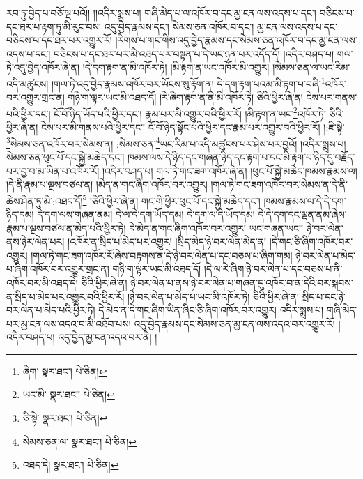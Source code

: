 རབ་ཏུ་བྱེད་པ་བཅོ་ལྔ་པའོ།། །།འདིར་སྨྲས་པ། གཞི་མེད་པ་ལ་འཁོར་བ་དང་མྱ་ངན་ལས་འདས་པ་དང་། བཅིངས་པ་དང་ཐར་པ་རྟག་ཏུ་མི་རུང་བས། འདུ་བྱེད་རྣམས་དང་། སེམས་ཅན་འཁོར་བ་དང་། མྱ་ངན་ལས་འདས་པ་དང་བཅིངས་པ་དང་ཐར་པར་འགྱུར་རོ། །རིགས་པ་གང་གིས་འདུ་བྱེད་རྣམས་དང་སེམས་ཅན་འཁོར་བ་དང་མྱ་ངན་ལས་འདས་པ་དང་། བཅིངས་པ་དང་ཐར་པར་མི་འཐད་པར་བསྟན་པ་དེ་ཡང་ཉན་པར་འདོད་དོ། །འདིར་བཤད་པ། གལ་ཏེ་འདུ་བྱེད་འཁོར་ཞེ་ན། །དེ་དག་རྟག་ན་མི་འཁོར་ཏེ། །མི་རྟག་ན་ཡང་འཁོར་མི་འགྱུར། །སེམས་ཅན་ལ་ཡང་རིམ་འདི་མཚུངས། །གལ་ཏེ་འདུ་བྱེད་རྣམས་འཁོར་བར་ཡོངས་སུ་རྟོག་ན། དེ་དག་རྟག་པའམ་མི་རྟག་པ་བཞི་\footnote{ཞིག་  སྣར་ཐང་།  པེ་ཅིན། }འཁོར་བར་འགྱུར་གྲང་ན། གཉི་ག་ལྟར་ཡང་མི་འཐད་དོ། །རེ་ཞིག་རྟག་ན་ནི་མི་འཁོར་ཏེ། ཅིའི་ཕྱིར་ཞེ་ན། ངེས་པར་གནས་པའི་ཕྱིར་དང་། ངོ་བོ་ཉིད་ཡོད་པའི་ཕྱིར་དང་། རྣམ་པར་མི་འགྱུར་བའི་ཕྱིར་རོ། །མི་རྟག་ན་ཡང་\footnote{ཡང་མི་  སྣར་ཐང་།  པེ་ཅིན། }འཁོར་ཏེ། ཅིའི་ཕྱིར་ཞེ་ན། ངེས་པར་མི་གནས་པའི་ཕྱིར་དང་། ངོ་བོ་ཉིད་སྟོང་པའི་ཕྱིར་དང་རྣམ་པར་འགྱུར་བའི་ཕྱིར་རོ། །:ཇི་སྟེ་\footnote{ཅི་སྟེ་  སྣར་ཐང་།  པེ་ཅིན། }སེམས་ཅན་འཁོར་བར་སེམས་ན། :སེམས་ཅན་\footnote{སེམས་ཅན་ལ་  སྣར་ཐང་།  པེ་ཅིན། }ཡང་རིམ་པ་འདི་མཚུངས་པར་ཤེས་པར་བྱའོ། །འདིར་སྨྲས་པ། སེམས་ཅན་ཕུང་པོ་དང་སྐྱེ་མཆེད་དང་། ཁམས་ལས་དེ་ཉིད་དང་གཞན་ཉིད་དང་རྟག་པ་དང་མི་རྟག་པ་ཉིད་དུ་བརྗོད་པར་བྱ་བ་མ་ཡིན་པ་འཁོར་རོ། །འདིར་བཤད་པ། གལ་ཏེ་གང་ཟག་འཁོར་ཞེ་ན། །ཕུང་པོ་སྐྱེ་མཆེད་ཁམས་རྣམས་ལ། །དེ་ནི་རྣམ་པ་ལྔས་བཙལ་ན། །མེད་ན་གང་ཞིག་འཁོར་བར་འགྱུར། །གལ་ཏེ་གང་ཟག་འཁོར་བར་སེམས་ན་དེ་ནི་ཆེས་ཤིན་ཏུ་མི་:འཐད་དོ།\footnote{འཐད་དེ།  སྣར་ཐང་།  པེ་ཅིན། } །ཅིའི་ཕྱིར་ཞེ་ན། གང་གི་ཕྱིར་ཕུང་པོ་དང་སྐྱེ་མཆེད་དང་། ཁམས་རྣམས་ལ་དེ་དེ་དག་ཉིད་དམ། དེ་དག་ལས་གཞན་ནམ། དེ་ལ་དེ་དག་ཡོད་དམ། དེ་དག་ལ་དེ་ཡོད་དམ། དེ་དེ་དག་དང་ལྡན་ནམ་ཞེས་རྣམ་པ་ལྔས་བཙལ་ན་མེད་པའི་ཕྱིར་ཏེ། དེ་མེད་ན་གང་ཞིག་འཁོར་བར་འགྱུར། ཡང་གཞན་ཡང་། ཉེ་བར་ལེན་ནས་ཉེར་ལེན་པར། །འཁོར་ན་སྲིད་པ་མེད་པར་འགྱུར། །སྲིད་མེད་ཉེ་བར་ལེན་མེད་ན། །དེ་གང་ཅི་ཞིག་འཁོར་བར་འགྱུར། །གལ་ཏེ་གང་ཟག་འཁོར་རོ་ཞེས་བརྟགས་ན་དེ་ཉེ་བར་ལེན་པ་དང་བཅས་པ་ཞིག་གམ། ཉེ་བར་ལེན་པ་མེད་པ་ཞིག་འཁོར་བར་འགྱུར་གྲང་ན། གཉི་ག་ལྟར་ཡང་མི་འཐད་དོ། །དེ་ལ་རེ་ཞིག་ཉེ་བར་ལེན་པ་དང་བཅས་པ་ནི་འཁོར་བར་མི་འཐད་དེ། ཅིའི་ཕྱིར་ཞེ་ན། ཉེ་བར་ལེན་པ་ནས་ཉེ་བར་ལེན་པ་གཞན་དུ་འཁོར་བ་ན་དེའི་བར་སྐབས་ན་སྲིད་པ་མེད་པར་འགྱུར་བའི་ཕྱིར་རོ། །ཉེ་བར་ལེན་པ་མེད་པ་ཡང་མི་འཁོར་ཏེ། ཅིའི་ཕྱིར་ཞེ་ན། སྲིད་པ་དང་ཉེ་བར་ལེན་པ་མེད་པའི་ཕྱིར་ཏེ། དེ་མེད་ན་དེ་གང་ཞིག་ཡིན་ཞིང་ཅི་ཞིག་འཁོར་བར་འགྱུར། འདིར་སྨྲས་པ། གཞི་མེད་པར་མྱ་ངན་ལས་འདའ་བ་མི་འཐོབ་པས། འདུ་བྱེད་རྣམས་དང་སེམས་ཅན་མྱ་ངན་ལས་འདའ་བར་འགྱུར་རོ། །འདིར་བཤད་པ། འདུ་བྱེད་མྱ་ངན་འདའ་བར་ནི། །
